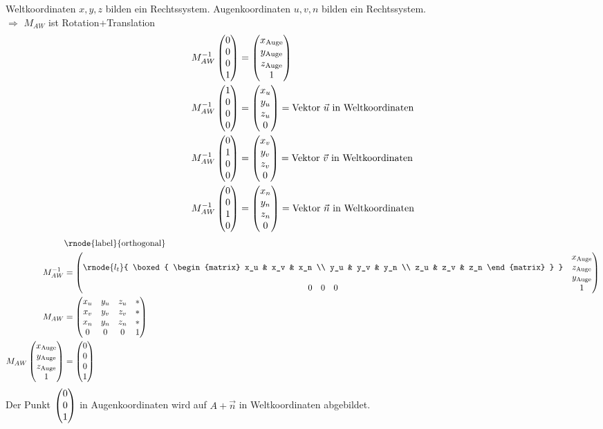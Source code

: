 \begin{itemize}
	Weltkoordinaten $x,y,z$ bilden ein Rechtssystem. Augenkoordinaten $u, v, n$ bilden ein Rechtssystem.\\
	$\Rightarrow$ $M_{AW}$ ist Rotation+Translation
	\begin{align*}
	 M_{AW}^{-1} \begin{pmatrix}0\\0\\0\\1\end{pmatrix} &= \begin{pmatrix}x_{\mathrm{Auge}}\\y_{\mathrm{Auge}}\\z_{\mathrm{Auge}}\\1\end{pmatrix}\\
	 M_{AW}^{-1} \begin{pmatrix}1\\0\\0\\0\end{pmatrix} &= \begin{pmatrix}x_u\\y_u\\z_u\\0\end{pmatrix} = \text{Vektor $\vec u$ in Weltkoordinaten}\\
	 M_{AW}^{-1} \begin{pmatrix}0\\1\\0\\0\end{pmatrix} &= \begin{pmatrix}x_v\\y_v\\z_v\\0\end{pmatrix} = \text{Vektor $\vec v$ in Weltkoordinaten}\\
	 M_{AW}^{-1} \begin{pmatrix}0\\0\\1\\0\end{pmatrix} &= \begin{pmatrix}x_n\\y_n\\z_n\\0\end{pmatrix} = \text{Vektor $\vec n$ in Weltkoordinaten}
	\end{align*}
	\begin{align*}
	&\text{\rnode{label}{orthogonal}}\\
	M_{AW}^{-1} &= \begin{pmatrix}
			 \rnode{l_t}{
				\boxed{
				\begin{matrix}
					x_u & x_v & x_n \\
					y_u & y_v & y_n \\
					z_u & z_v & z_n
				\end{matrix}
				}
			 } &
			\begin{matrix}
				x_{\mathrm{Auge}} \\
				z_{\mathrm{Auge}} \\
				y_{\mathrm{Auge}}
			\end{matrix}\\
			\begin{matrix}
	                0 & 0 & 0
	                \end{matrix}& 1
	                \end{pmatrix}\\
	M_{AW} &= \begin{pmatrix}
	            x_u  & y_u & z_u & *\\
	            x_v  & y_v & z_v & *\\
	            x_n  & y_n & z_n & *\\
	            0    & 0   & 0   & 1
	           \end{pmatrix}\\
	M_{AW} \vfour{x_{\mathrm{Auge}}}{y_{\mathrm{Auge}}}{z_{\mathrm{Auge}}}{1} &= \vfour{0}{0}{0}{1}
	\end{align*}
	Der Punkt $\begin{pmatrix}0\\0\\1\end{pmatrix}$ in Augenkoordinaten wird auf $A+\vec n$ in Weltkoordinaten abgebildet.

\end{itemize}
